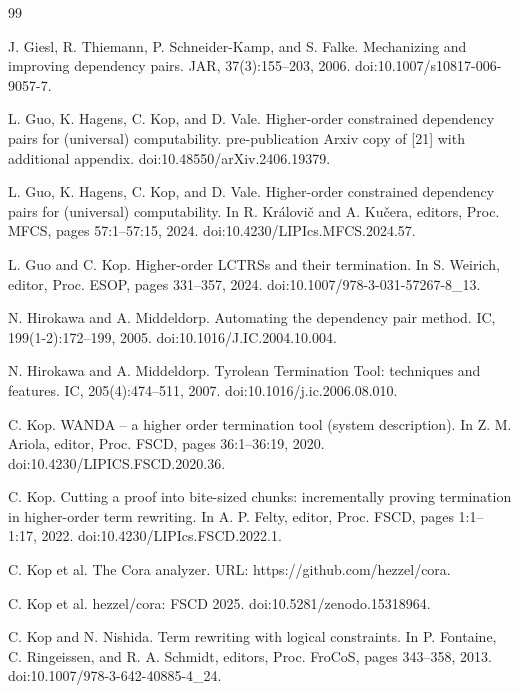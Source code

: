 \documentclass[10pt,a4paper]{amsart}
\begin{document}
\begin{thebibliography}{99}
\par\noindent  [19]  J. Giesl, R. Thiemann, P. Schneider-Kamp, and S. Falke.  Mechanizing and improving dependency pairs.  JAR, 37(3):155–203, 2006.  doi:10.1007/s10817-006-9057-7.  
 
\par\noindent  [20]  L. Guo, K. Hagens, C. Kop, and D. Vale.  Higher-order constrained dependency pairs for (universal) computability.  pre-publication Arxiv copy of [21] with additional appendix.  doi:10.48550/arXiv.2406.19379.  
 
\par\noindent  [21]  L. Guo, K. Hagens, C. Kop, and D. Vale.  Higher-order constrained dependency pairs for (universal) computability.  In R. Královič and A. Kučera, editors, Proc. MFCS, pages 57:1–57:15, 2024.  doi:10.4230/LIPIcs.MFCS.2024.57.  
 
\par\noindent  [22]  L. Guo and C. Kop.  Higher-order LCTRSs and their termination.  In S. Weirich, editor, Proc. ESOP, pages 331–357, 2024.  doi:10.1007/978-3-031-57267-8\_13.  
 
\par\noindent  [23]  N. Hirokawa and A. Middeldorp.  Automating the dependency pair method.  IC, 199(1-2):172–199, 2005.  doi:10.1016/J.IC.2004.10.004.  
 
\par\noindent  [24]  N. Hirokawa and A. Middeldorp.  Tyrolean Termination Tool: techniques and features.  IC, 205(4):474–511, 2007.  doi:10.1016/j.ic.2006.08.010.  
 
\par\noindent  [25]  C. Kop.  WANDA – a higher order termination tool (system description).  In Z. M. Ariola, editor, Proc. FSCD, pages 36:1–36:19, 2020.  doi:10.4230/LIPICS.FSCD.2020.36.  
 
\par\noindent  [26]  C. Kop.  Cutting a proof into bite-sized chunks: incrementally proving termination in higher-order term rewriting.  In A. P. Felty, editor, Proc. FSCD, pages 1:1–1:17, 2022.  doi:10.4230/LIPIcs.FSCD.2022.1.  
 
\par\noindent  [27]  C. Kop et al.  The Cora analyzer.  URL: https://github.com/hezzel/cora.  
 
\par\noindent  [28]  C. Kop et al.  hezzel/cora: FSCD 2025.  doi:10.5281/zenodo.15318964.  
 
\par\noindent  [29]  C. Kop and N. Nishida.  Term rewriting with logical constraints.  In P. Fontaine, C. Ringeissen, and R. A. Schmidt, editors, Proc. FroCoS, pages 343–358, 2013.  doi:10.1007/978-3-642-40885-4\_24.  
 

\end{thebibliography}
\end{document}
